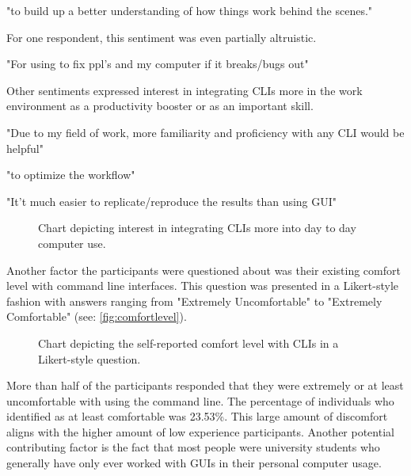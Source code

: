\begin{quotes}
	"to build up a better understanding of how things work behind the scenes."
\end{quotes}

For one respondent, this sentiment was even partially altruistic.

\begin{quotes}
	"For using to fix ppl's and my computer if it breaks/bugs out"
\end{quotes}

Other sentiments expressed interest in integrating CLIs more in the work
environment as a productivity booster or as an important skill.


\begin{quotes}
	"Due to my field of work, more familiarity and proficiency with any CLI would be helpful"
\end{quotes}

\begin{quotes}
	"to optimize the workflow"
\end{quotes}

\begin{quotes}
	"It't much easier to replicate/reproduce the results than using GUI"
\end{quotes}

\begin{figure}[htbp]
	\scalebox{0.65}{}
	\caption{Chart depicting interest in integrating CLIs more into day to day computer use.}
	\label{fig:daytoday}
\end{figure}

Another factor the participants were questioned about was their existing
comfort level with command line interfaces. This question was presented in a
Likert-style fashion with answers ranging from "Extremely Uncomfortable" to
"Extremely Comfortable" (see: \autoref{fig:comfortlevel}).

\begin{figure}[H]
	\scalebox{0.72}{}
	\caption{Chart depicting the self-reported comfort level with CLIs in a Likert-style question.}
	\label{fig:comfortlevel}
\end{figure}

More than half of the participants responded that they were extremely or at
least uncomfortable with using the command line. The percentage of individuals
who identified as at least comfortable was 23.53\%. This large amount of
discomfort aligns with the higher amount of low experience participants.
Another potential contributing factor is the fact that most people were
university students who generally have only ever worked with GUIs in their
personal computer usage.

